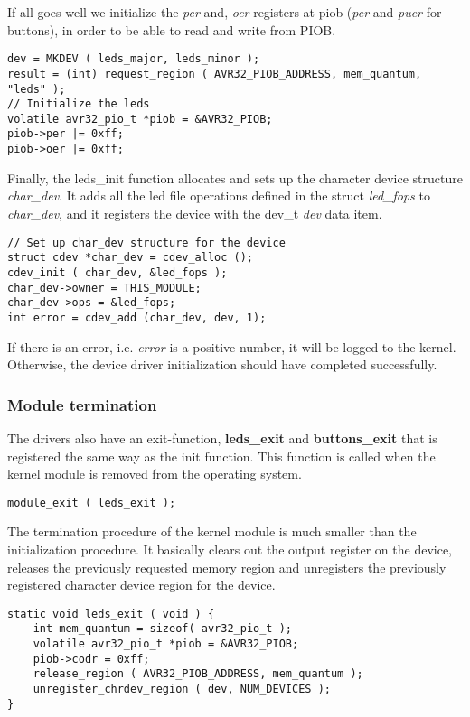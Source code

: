 If all goes well we initialize the \textit{per} and, 
\textit{oer} registers at piob (\textit{per} and \textit{puer}
for buttons), in order to be able to read and write from PIOB.
\\
\begin{lstlisting}
dev = MKDEV ( leds_major, leds_minor );
result = (int) request_region ( AVR32_PIOB_ADDRESS, mem_quantum, "leds" );
// Initialize the leds
volatile avr32_pio_t *piob = &AVR32_PIOB;
piob->per |= 0xff;
piob->oer |= 0xff;
\end{lstlisting}
Finally, the leds\_init function allocates and sets up the character 
device structure \textit{char\_dev}. 
It adds all the led file operations defined in
the struct \textit{led\_fops} to \textit{char\_dev}, and 
it registers the device with the dev\_t \textit{dev} data item.
\\
\begin{lstlisting}
// Set up char_dev structure for the device
struct cdev *char_dev = cdev_alloc ();
cdev_init ( char_dev, &led_fops );
char_dev->owner = THIS_MODULE;
char_dev->ops = &led_fops;
int error = cdev_add (char_dev, dev, 1);
\end{lstlisting}
If there is an error, i.e. \textit{error} is a positive number, it will
be logged to the kernel. Otherwise, the device driver initialization 
should have completed successfully.

\subsubsection{Module termination}
The drivers also have an exit-function, \textbf{leds\_exit} and 
\textbf{buttons\_exit} that is registered the same way as 
the init function. This function is called when the kernel module is 
removed from the operating system. 
\\
\begin{lstlisting}
module_exit ( leds_exit );
\end{lstlisting}
The termination procedure of the kernel module is much smaller than the 
initialization procedure. It basically clears out the output register
on the device, releases the previously requested memory region and
unregisters the previously registered character device region for
the device.
\\
\begin{lstlisting}
static void leds_exit ( void ) {
	int mem_quantum = sizeof( avr32_pio_t );
	volatile avr32_pio_t *piob = &AVR32_PIOB;
	piob->codr = 0xff;
	release_region ( AVR32_PIOB_ADDRESS, mem_quantum );
	unregister_chrdev_region ( dev, NUM_DEVICES );
}
\end{lstlisting}

